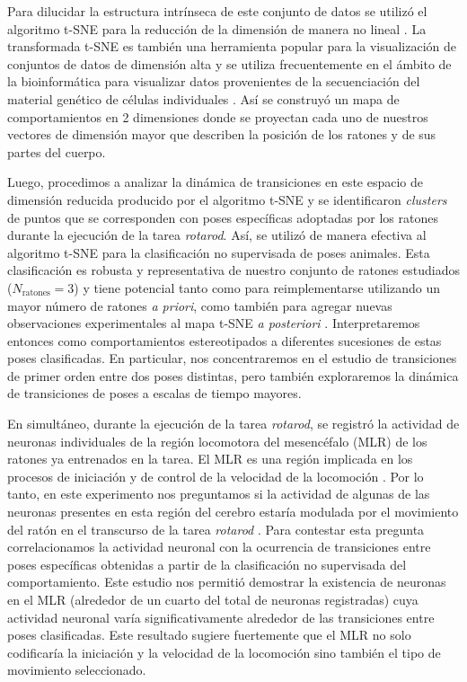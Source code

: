 Para dilucidar la estructura intrínseca de este conjunto de datos se utilizó el algoritmo t-SNE para la reducción de la dimensión de manera no lineal \cite{vdm_tsne}. La transformada t-SNE es también una herramienta popular para la visualización de conjuntos de datos de dimensión alta y se utiliza frecuentemente en el ámbito de la bioinformática para visualizar datos provenientes de la secuenciación del material genético de células individuales \cite{kobak_art}. Así se construyó un mapa de comportamientos en 2 dimensiones donde se proyectan cada uno de nuestros vectores de dimensión mayor que describen la posición de los ratones y de sus partes del cuerpo.

Luego, procedimos a analizar la dinámica de transiciones en este espacio de dimensión reducida producido por el algoritmo t-SNE y se identificaron \textit{clusters} de puntos que se corresponden con poses específicas adoptadas por los ratones durante la ejecución de la tarea \textit{rotarod}. Así, se utilizó de manera efectiva al algoritmo t-SNE para la clasificación no supervisada de poses animales. Esta clasificación es robusta y representativa de nuestro conjunto de ratones estudiados ($N_{\mathrm{ratones}}=3$) y tiene potencial tanto como para reimplementarse utilizando un mayor número de ratones \textit{a priori}, como también para agregar nuevas observaciones experimentales al mapa t-SNE \textit{a posteriori} \cite{kobak_art, korsunsky_harmony}. Interpretaremos entonces como comportamientos estereotipados a diferentes sucesiones de estas poses clasificadas. En particular, nos concentraremos en el estudio de transiciones de primer orden entre dos poses distintas, pero también exploraremos la dinámica de transiciones de poses a escalas de tiempo mayores.

En simultáneo, durante la ejecución de la tarea \textit{rotarod}, se registró la actividad de neuronas individuales de la región locomotora del mesencéfalo (MLR) de los ratones ya entrenados en la tarea. El MLR es una región implicada en los procesos de iniciación y de control de la velocidad de la locomoción \cite{caggiano_midbrain, roseberry_locomotor, shik_walking}. Por lo tanto, en este experimento nos preguntamos si la actividad de algunas de las neuronas presentes en esta región del cerebro estaría modulada por el movimiento del ratón en el transcurso de la tarea \textit{rotarod} \cite{skinner_mlr_rat, sherman_mlr_cat, leray_mlr_vertebrate}. Para contestar esta pregunta correlacionamos la actividad neuronal con la ocurrencia de transiciones entre poses específicas obtenidas a partir de la clasificación no supervisada del comportamiento. Este estudio nos permitió demostrar la existencia de neuronas en el MLR (alrededor de un cuarto del total de neuronas registradas) cuya actividad neuronal varía significativamente alrededor de las transiciones entre poses clasificadas. Este resultado sugiere fuertemente que el MLR no solo codificaría la iniciación y la velocidad de la locomoción sino también el tipo de movimiento seleccionado.

\thispagestyle{empty}